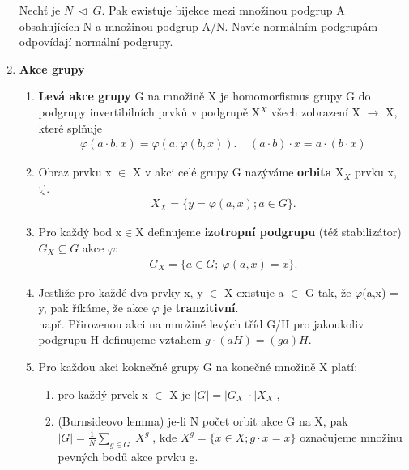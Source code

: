 \documentclass[12pt,a4paper]{article}
\begin{document}
\begin{enumerate}
	Nechť je $N \ \lhd\ G$. Pak ewistuje bijekce mezi množinou podgrup A obsahujících N a množinou podgrup A/N. Navíc normálním podgrupám odpovídají normální podgrupy.
	
	\item \textbf{Akce grupy}
	
	\begin{enumerate}
		\item \textbf{Levá akce grupy} G na množině X je homomorfismus grupy G do podgrupy invertibilních prvků v podgrupě X$^X$ všech zobrazení X $\rightarrow$ X, které splňuje 
		\begin{align*}
		\varphi(a\cdot b,x) = \varphi(a,\varphi(b,x)).\	\ \ \ \	(a\cdot b)\cdot x = a\cdot (b\cdot x)
		\end{align*} 
		
		\item Obraz prvku x $\in$ X v akci celé grupy G nazýváme \textbf{orbita} X$_X$ prvku x, tj.
		\begin{align*}
		X_X = \{y = \varphi(a,x); a\in G\}.
		\end{align*} 
		
		\item Pro každý bod x$\in$X definujeme \textbf{izotropní podgrupu} (též stabilizátor) $G_X \subseteq G$ akce $\varphi$:
		\begin{align*}
		G_X = \{a \in G;\ \varphi(a,x) =x\}.
		\end{align*}
		\item 
		Jestliže pro každé dva prvky x, y $\in$ X existuje a $\in$ G tak, že $\varphi$(a,x) = y, pak říkáme, že akce $\varphi$ je \textbf{tranzitivní}. \\
		např. Přirozenou akci na množině levých tříd G/H pro jakoukoliv podgrupu H definujeme vztahem $g\cdot (aH) = (ga) H$.
		
		\item Pro každou akci koknečné grupy G na konečné množině X platí:
		\begin{enumerate}
			\item pro každý prvek x $\in$ X je $|G| = |G_X|\cdot |X_X|$,
			\item (Burnsideovo lemma) je-li N počet orbit akce G na X, pak $|G| = \frac{1}{N}\sum_{g\in G}|X^g|$, kde $X^g = \{x \in X; g\cdot x = x\}$ označujeme množinu pevných bodů akce prvku g.
		\end{enumerate}
	\end{enumerate}


\end{enumerate}
\end{document}
